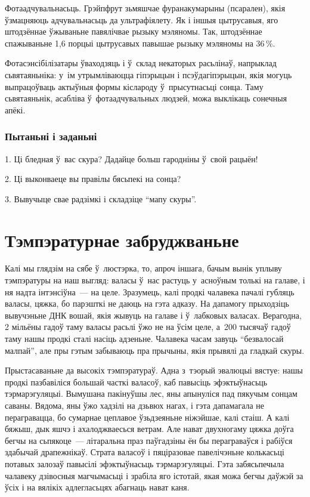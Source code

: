 Фотаадчувальнасьць. Грэйпфрут зьмяшчае фуранакумарыны (псарален), якія ўзмацняюць адчувальнасьць да ультрафіялету. Як і іншыя цытрусавыя, яго штодзённае ўжываньне павялічвае рызыку мэляномы. Так, штодзённае спажываньне 1,6 порцыі цытрусавых павышае рызыку мэляномы на 36\,\%. 

Фотасэнсібілізатары ўваходзяць і ў~склад некаторых расьлінаў, напрыклад сьвятаяньніка: у~ім утрымліваюцца гіпэрыцын і псэўдагіпэрыцын, якія могуць выпрацоўваць актыўныя формы кіслароду ў~прысутнасьці сонца. Таму сьвятаяньнік, асабліва ў~фотаадчувальных людзей, можа выклікаць сонечныя апёкі.

\subsubsection{Пытаньні і заданьні}

1. Ці бледная ў~вас скура? Дадайце больш гародніны ў~свой рацыён!

2. Ці выконваеце вы правілы бясьпекі на сонца?

3. Вывучыце свае радзімкі і складзіце ``мапу скуры''.


\section{Тэмпэратурнае забруджваньне}

Калі мы глядзім на сябе ў~люстэрка, то, апроч іншага, бачым вынік уплыву тэмпэратуры на наш выгляд: валасы ў~нас растуць у~асноўным толькі на галаве, і ня надта інтэнсіўна~--- на целе. Зразумець, калі продкі чалавека пачалі губляць валасы, цяжка, бо парэшткі не даюць на гэта адказу. На дапамогу прыходзіць вывучэньне ДНК вошай, якія жывуць на галаве і ў~лабковых валасах. Верагодна, 2 мільёны гадоў таму валасы расьлі ўжо не на ўсім целе, а~200 тысячаў гадоў таму нашы продкі сталі насіць адзеньне. Чалавека часам завуць ``безвалосай малпай'', але пры гэтым забываюць пра прычыны, якія прывялі да гладкай скуры.

Прыстасаваньне да высокіх тэмпэратураў. Адна з~тэорый эвалюцыі вястуе: нашы продкі пазбавіліся большай часткі валасоў, каб павысіць эфэктыўнасьць тэрмарэгуляцыі. Вымушана пакінуўшы лес, яны апынуліся пад пякучым сонцам саваны. Вядома, яны ўжо хадзілі на дзьвюх нагах, і гэта дапамагала не перагравацца, бо сумарнае цеплавое ўзьдзеяньне ніжэйшае, калі стаіш. А калі бяжыш, дык яшчэ і ахалоджваесься ветрам. Але нават двухногаму цяжка доўга бегчы на сьпякоце~--- літаральна праз паўгадзіны ён бы пераграваўся і рабіўся здабычай драпежнікаў. Страта валасоў і пяціразовае павелічэньне колькасьці потавых залозаў павысілі эфэктыўнасьць тэрмарэгуляцыі. Гэта забясьпечыла чалавеку дзівосныя магчымасьці і зрабіла яго істотай, якая можа бегчы даўжэй за ўсіх і на вялікіх адлегласьцях абагнаць нават каня.

